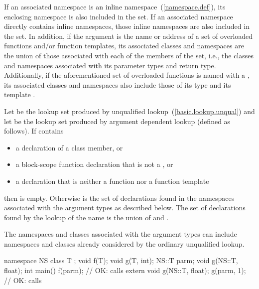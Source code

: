 If an associated namespace is an inline namespace~(\ref{namespace.def}), its
enclosing namespace is also included in the set. If an associated namespace
directly contains inline namespaces, those inline namespaces are also included
in the set.
In addition, if the argument is the name or address of a set of
overloaded functions and/or function templates, its associated classes
and namespaces are the union of those associated with each of the
members of the set, i.e., the classes and namespaces associated with its
parameter types and return type.
Additionally, if the aforementioned set of overloaded functions is named with
a , its associated classes and namespaces also include
those of its type  and its template
.

\pnum
Let  be the lookup set produced by unqualified
lookup~(\ref{basic.lookup.unqual}) and let  be the lookup set produced
by argument dependent lookup (defined as follows). If  contains
\begin{itemize}
\item a declaration of a class member, or
\item a block-scope function declaration that is not a , or
\item a declaration that is neither a function nor a function template
\end{itemize}
then  is empty. Otherwise  is the set of declarations
found in the namespaces associated with the argument types as described
below. The set of declarations found by the lookup of the name is the
union of  and . \begin{note} The namespaces and classes
associated with the argument types can include namespaces and classes
already considered by the ordinary unqualified lookup. \end{note}
\begin{example}

\begin{codeblock}
namespace NS {
  class T { };
  void f(T);
  void g(T, int);
}
NS::T parm;
void g(NS::T, float);
int main() {
  f(parm);                      // OK: calls 
  extern void g(NS::T, float);
  g(parm, 1);                   // OK: calls 
}
\end{codeblock}
\end{example}

